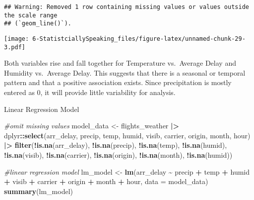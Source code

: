 \documentclass[
]{article}
\newenvironment{Shaded}{\begin{snugshade}}{\end{snugshade}}
\newcommand{\AttributeTok}[1]{\textcolor[rgb]{0.13,0.29,0.53}{#1}}
\newcommand{\CommentTok}[1]{\textcolor[rgb]{0.56,0.35,0.01}{\textit{#1}}}
\newcommand{\FunctionTok}[1]{\textcolor[rgb]{0.13,0.29,0.53}{\textbf{#1}}}
\newcommand{\NormalTok}[1]{#1}
\newcommand{\OtherTok}[1]{\textcolor[rgb]{0.56,0.35,0.01}{#1}}
\newcommand{\SpecialCharTok}[1]{\textcolor[rgb]{0.81,0.36,0.00}{\textbf{#1}}}
\begin{document}
\begin{verbatim}
## Warning: Removed 1 row containing missing values or values outside the scale range
## (`geom_line()`).
\end{verbatim}

\texttt{[image: 6-StatistciallySpeaking\_files/figure-latex/unnamed-chunk-29-3.pdf]}

Both variables rise and fall together for Temperature vs.~Average Delay
and Humidity vs.~Average Delay. This suggests that there is a seasonal
or temporal pattern and that a positive association exists. Since
precipitation is mostly entered as 0, it will provide little variability
for analysis.

Linear Regression Model

\begin{Shaded}
\begin{Highlighting}[]
\CommentTok{\#omit missing values}
\NormalTok{model\_data }\OtherTok{\textless{}{-}}\NormalTok{ flights\_weather }\SpecialCharTok{|\textgreater{}}
\NormalTok{  dplyr}\SpecialCharTok{::}\FunctionTok{select}\NormalTok{(arr\_delay, precip, temp, humid, visib, carrier, origin, month, hour) }\SpecialCharTok{|\textgreater{}}
  \FunctionTok{filter}\NormalTok{(}\SpecialCharTok{!}\FunctionTok{is.na}\NormalTok{(arr\_delay), }\SpecialCharTok{!}\FunctionTok{is.na}\NormalTok{(precip), }\SpecialCharTok{!}\FunctionTok{is.na}\NormalTok{(temp), }\SpecialCharTok{!}\FunctionTok{is.na}\NormalTok{(humid), }\SpecialCharTok{!}\FunctionTok{is.na}\NormalTok{(visib), }\SpecialCharTok{!}\FunctionTok{is.na}\NormalTok{(carrier), }\SpecialCharTok{!}\FunctionTok{is.na}\NormalTok{(origin), }\SpecialCharTok{!}\FunctionTok{is.na}\NormalTok{(month), }\SpecialCharTok{!}\FunctionTok{is.na}\NormalTok{(humid))}

\CommentTok{\#linear regression model}
\NormalTok{lm\_model }\OtherTok{\textless{}{-}} \FunctionTok{lm}\NormalTok{(arr\_delay }\SpecialCharTok{\textasciitilde{}}\NormalTok{ precip }\SpecialCharTok{+}\NormalTok{ temp }\SpecialCharTok{+}\NormalTok{ humid }\SpecialCharTok{+}\NormalTok{ visib }\SpecialCharTok{+}\NormalTok{ carrier }\SpecialCharTok{+}\NormalTok{ origin }\SpecialCharTok{+}\NormalTok{ month }\SpecialCharTok{+}\NormalTok{ hour, }\AttributeTok{data =}\NormalTok{ model\_data)}
\FunctionTok{summary}\NormalTok{(lm\_model)}
\end{Highlighting}
\end{Shaded}
\end{document}

